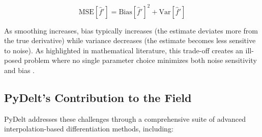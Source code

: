 \documentclass[10pt,journal,compsoc]{IEEEtran}
\begin{document}
\begin{equation}
    \text{MSE}[\hat{f}'] = \text{Bias}[\hat{f}']^2 + \text{Var}[\hat{f}']
\end{equation}

As smoothing increases, bias typically increases (the estimate deviates more from the true derivative) while variance decreases (the estimate becomes less sensitive to noise). As highlighted in mathematical literature, this trade-off creates an ill-posed problem where no single parameter choice minimizes both noise sensitivity and bias \cite{knowles1995variational}.

\subsection{PyDelt's Contribution to the Field}

PyDelt addresses these challenges through a comprehensive suite of advanced interpolation-based differentiation methods, including:
\end{document}
